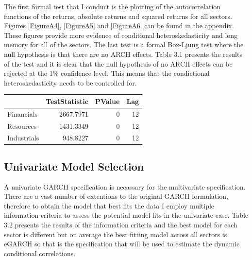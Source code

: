 \documentclass[12pt,preprint, authoryear]{elsarticle}
\let\origtable\table
\let\endorigtable\endtable
\renewenvironment{table}[1][2] {
    \expandafter\origtable\expandafter[H]
} {
    \endorigtable
}
\numberwithin{equation}{section}
\numberwithin{figure}{section}
\numberwithin{table}{section}
\begin{document}
The first formal test that I conduct is the plotting of the
autocorrelation functions of the returns, absolute returns and squared
returns for all sectors. Figures \ref{FigureA4}, \ref{FigureA5} and
\ref{FigureA6} can be found in the appendix. These figures provide more
evidence of conditional heteroskedasticity and long memory for all of
the sectors. The last test is a formal Box-Ljung test where the null
hypothesis is that there are no ARCH effects. Table 3.1 presents the
results of the test and it is clear that the null hypothesis of no ARCH
effects can be rejected at the 1\% confidence level. This means that the
condictional heteroskedasticity needs to be controlled for.

\begin{table}

\caption{\label{tab:unnamed-chunk-5}Ljung-Box Test Results}
\centering
\begin{tabular}[t]{l|r|r|r}
\hline
  & TestStatistic & PValue & Lag\\
\hline
Financials & 2667.7971 & 0 & 12\\
\hline
Resources & 1431.3349 & 0 & 12\\
\hline
Industrials & 948.8227 & 0 & 12\\
\hline
\end{tabular}
\end{table}

\hypertarget{univariate-model-selection}{%
\subsection{Univariate Model
Selection}\label{univariate-model-selection}}

A univariate GARCH specification is necassary for the multivariate
specification. There are a vast number of extentions to the original
GARCH formulation, therefore to obtain the model that best fits the data
I employ multiple information criteria to assess the potential model
fits in the univariate case. Table 3.2 presents the results of the
information criteria and the best model for each sector is different but
on average the best fitting model across all sectors is eGARCH so that
is the specification that will be used to estimate the dynamic
conditional correlations.
\end{document}
